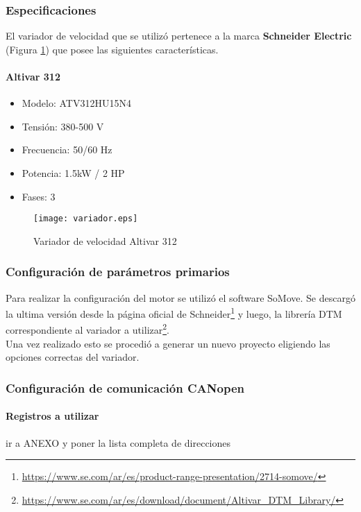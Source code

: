 \subsubsection{Especificaciones}
El variador de velocidad que se utilizó pertenece a la marca \textbf{Schneider Electric} (Figura \ref{fig:variador}) que posee las siguientes características. \\
	\paragraph*{Altivar 312}
	\begin{itemize}
		\item 	Modelo: ATV312HU15N4
		\item   Tensión: 380-500 V
		\item 	Frecuencia: 50/60 Hz
		\item 	Potencia: 1.5kW / 2 HP
		\item 	Fases: 3
	\end{itemize}

	\begin{figure}[h!]
		\centering
		\texttt{[image: variador.eps]}
		\caption{Variador de velocidad Altivar 312}
		\label{fig:variador}
	\end{figure}


	\subsubsection{Configuración de parámetros primarios}
	Para realizar la configuración del motor se utilizó el software SoMove. Se descargó la ultima versión desde la página oficial de Schneider\footnote{\url{https://www.se.com/ar/es/product-range-presentation/2714-somove/}} y luego, la librería DTM correspondiente al variador a utilizar\footnote{\url{https://www.se.com/ar/es/download/document/Altivar_DTM_Library/}}. 
	\\
	Una vez realizado esto se procedió a generar un nuevo proyecto eligiendo las opciones correctas del variador.
	
	\subsubsection{Configuración de comunicación CANopen}

	\paragraph{Registros a utilizar}
	ir a ANEXO y poner la lista completa de direcciones

	\newpage

